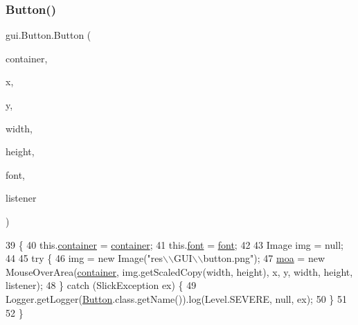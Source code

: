 \subsubsection{\texorpdfstring{Button()}{Button()}\hspace{0.1cm}{\footnotesize\ttfamily [2/4]}}
{\footnotesize\ttfamily gui.\+Button.\+Button (\begin{DoxyParamCaption}\item[{\mbox{\hyperlink{classorg_1_1newdawn_1_1slick_1_1_game_container}{Game\+Container}}}]{container,  }\item[{int}]{x,  }\item[{int}]{y,  }\item[{int}]{width,  }\item[{int}]{height,  }\item[{\mbox{\hyperlink{classgui_1_1_g_u_i_font}{G\+U\+I\+Font}}}]{font,  }\item[{\mbox{\hyperlink{interfaceorg_1_1newdawn_1_1slick_1_1gui_1_1_component_listener}{Component\+Listener}}}]{listener }\end{DoxyParamCaption})\hspace{0.3cm}{\ttfamily [inline]}}


\begin{DoxyCode}
39                                                                                                            
                     \{
40         this.\mbox{\hyperlink{classgui_1_1_button_a91cd8f6ba1fa010f564dcbc4561ce9a7}{container}} = \mbox{\hyperlink{classgui_1_1_button_a91cd8f6ba1fa010f564dcbc4561ce9a7}{container}};
41         this.\mbox{\hyperlink{classgui_1_1_button_a7f22b2fc3bd45d47a55a2d3ef20e5452}{font}} = \mbox{\hyperlink{classgui_1_1_button_a7f22b2fc3bd45d47a55a2d3ef20e5452}{font}};
42 
43         Image img = null;
44 
45         \textcolor{keywordflow}{try} \{
46             img = \textcolor{keyword}{new} Image(\textcolor{stringliteral}{"res\(\backslash\)\(\backslash\)GUI\(\backslash\)\(\backslash\)button.png"});
47             \mbox{\hyperlink{classgui_1_1_button_abccfc83b8fee5280bf5022b3b211054e}{moa}} = \textcolor{keyword}{new} MouseOverArea(\mbox{\hyperlink{classgui_1_1_button_a91cd8f6ba1fa010f564dcbc4561ce9a7}{container}}, img.getScaledCopy(width, height), x, y, width, 
      height, listener);
48         \} \textcolor{keywordflow}{catch} (SlickException ex) \{
49             Logger.getLogger(\mbox{\hyperlink{classgui_1_1_button_a9d43604fe7ed9d76404abba348ff731e}{Button}}.class.getName()).log(Level.SEVERE, null, ex);
50         \}
51 
52     \}
\end{DoxyCode}
\mbox{\label{classgui_1_1_button_a9cccf685f91dd107de82319b145bba52}} 
